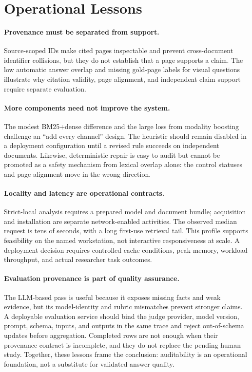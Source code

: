 \section{Operational Lessons}
\paragraph{Provenance must be separated from support.}
Source-scoped IDs make cited pages inspectable and prevent cross-document identifier collisions, but they do not establish that a page supports a claim. The low automatic answer overlap and missing gold-page labels for visual questions illustrate why citation validity, page alignment, and independent claim support require separate evaluation.

\paragraph{More components need not improve the system.}
The modest BM25+dense difference and the large loss from modality boosting challenge an ``add every channel'' design. The heuristic should remain disabled in a deployment configuration until a revised rule succeeds on independent documents. Likewise, deterministic repair is easy to audit but cannot be promoted as a safety mechanism from lexical overlap alone: the control statuses and page alignment move in the wrong direction.

\paragraph{Locality and latency are operational contracts.}
Strict-local analysis requires a prepared model and document bundle; acquisition and installation are separate network-enabled activities. The observed median request is tens of seconds, with a long first-use retrieval tail. This profile supports feasibility on the named workstation, not interactive responsiveness at scale. A deployment decision requires controlled cache conditions, peak memory, workload throughput, and actual researcher task outcomes.

\paragraph{Evaluation provenance is part of quality assurance.}
The LLM-based pass is useful because it exposes missing facts and weak evidence, but its model-identity and rubric mismatches prevent stronger claims. A deployable evaluation service should bind the judge provider, model version, prompt, schema, inputs, and outputs in the same trace and reject out-of-schema updates before aggregation. Completed rows are not enough when their provenance contract is incomplete, and they do not replace the pending human study. Together, these lessons frame the conclusion: auditability is an operational foundation, not a substitute for validated answer quality.
